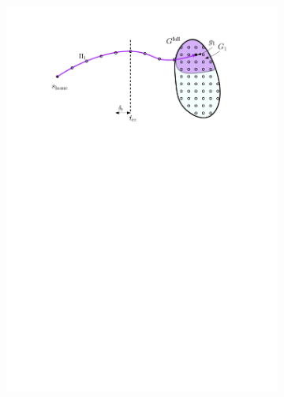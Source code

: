 \documentclass[conference]{IEEEtran}
\begin{document}
\begin{figure}[t]
    \centering
    \begin{subfigure}{.225\textwidth}
        \includegraphics[width=\textwidth]{pre1}
        \caption{}
        \label{fig:pre1}
    \end{subfigure}
    \begin{subfigure}{0.225\textwidth}

\end{subfigure}
\end{figure}
\end{document}
